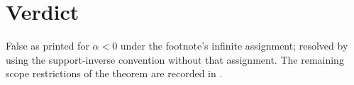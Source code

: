 \documentclass{article}
\begin{document}
\section{Verdict}
False as printed for $\alpha<0$ under the footnote's infinite assignment;
resolved by using the support-inverse convention without that assignment.
The remaining scope restrictions of the theorem are recorded in
.



\end{document}
